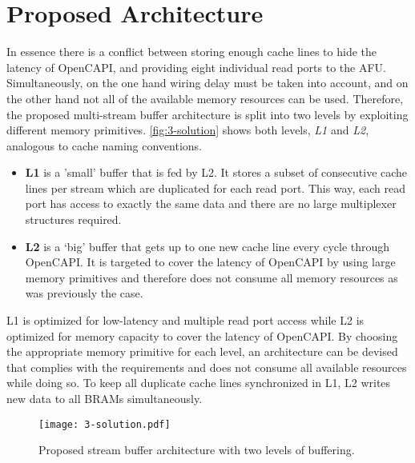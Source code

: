 \section{Proposed Architecture}
\label{sec:final-design}
In essence there is a conflict between storing enough cache lines to hide the latency of OpenCAPI, and providing eight individual read ports to the AFU. Simultaneously, on the one hand wiring delay must be taken into account, and on the other hand not all of the available memory resources can be used. Therefore, the proposed multi-stream buffer architecture is split into two levels by exploiting different memory primitives. \autoref{fig:3-solution} shows both levels, \textit{L1} and \textit{L2}, analogous to cache naming conventions.
\begin{itemize}
  \item{\textbf{L1} is a 'small' buffer that is fed by L2. It stores a subset of consecutive cache lines per stream which are duplicated for each read port. This way, each read port has access to exactly the same data and there are no large multiplexer structures required.}
  \item{\textbf{L2} is a ‘big’ buffer that gets up to one new cache line every cycle through OpenCAPI. It is targeted to cover the latency of OpenCAPI by using large memory primitives and therefore does not consume all memory resources as was previously the case.}
\end{itemize}
L1 is optimized for low-latency and multiple read port access while L2 is optimized for memory capacity to cover the latency of OpenCAPI. By choosing the appropriate memory primitive for each level, an architecture can be devised that complies with the requirements and does not consume all available resources while doing so. To keep all duplicate cache lines synchronized in L1, L2 writes new data to all BRAMs simultaneously.

\begin{figure}[H]
  \centering
  \texttt{[image: 3-solution.pdf]}
  \caption{Proposed stream buffer architecture with two levels of buffering.}
  \label{fig:3-solution}
\end{figure}

